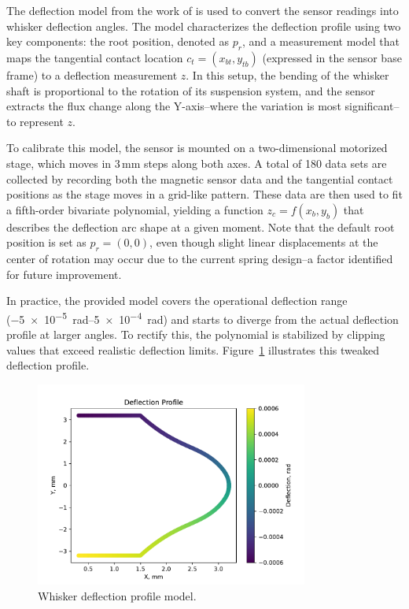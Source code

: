 The deflection model from the work of \textcite{dang2025whisker} is used to convert the sensor readings into whisker deflection angles.
The model characterizes the deflection profile using two key components: the root position, denoted as \(p_r\), and a measurement model that maps the tangential contact location \(c_t = (x_{bt}, y_{tb})\) (expressed in the sensor base frame) to a deflection measurement \(z\).
In this setup, the bending of the whisker shaft is proportional to the rotation of its suspension system, and the sensor extracts the flux change along the Y-axis--where the variation is most significant--to represent \(z\).

To calibrate this model, the sensor is mounted on a two-dimensional motorized stage, which moves in 3\,mm steps along both axes.
A total of 180 data sets are collected by recording both the magnetic sensor data and the tangential contact positions as the stage moves in a grid-like pattern.
These data are then used to fit a fifth-order bivariate polynomial, yielding a function \(z_c = f(x_b, y_b)\) that describes the deflection arc shape at a given moment.
Note that the default root position is set as \(p_r = (0,0)\), even though slight linear displacements at the center of rotation may occur due to the current spring design--a factor identified for future improvement.

In practice, the provided model covers the operational deflection range (\qtyrange{-5e-5}{5e-4}{\radian}) and starts to diverge from the actual deflection profile at larger angles.
To rectify this, the polynomial is stabilized by clipping values that exceed realistic deflection limits.
Figure~\ref{fig:deflection_profile} illustrates this tweaked deflection profile.

\begin{figure}[htb]
    \centering
    \includegraphics[width=0.8\textwidth]{figures/deflection_profile}
    \caption{Whisker deflection profile model.}
    \label{fig:deflection_profile}
\end{figure}

